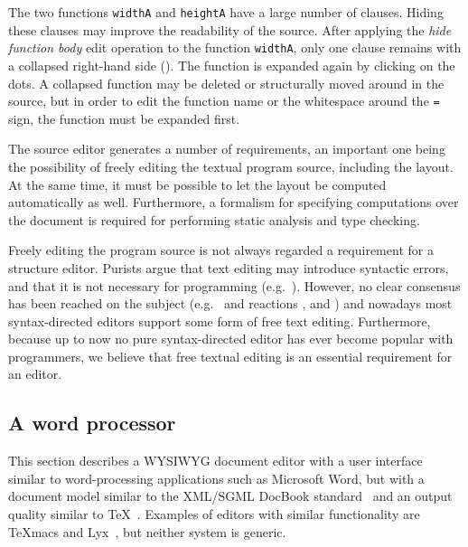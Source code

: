 The two functions \verb|widthA| and \verb|heightA| have a large number of clauses. Hiding these clauses may improve the readability of the source. After applying the {\em hide function body} edit operation to the function \verb|widthA|,  only one clause remains with a collapsed right-hand side ({\tt \framebox{\rule{0cm}{1.5ex}\dots}}). The function is expanded again by clicking on the dots. A collapsed function may be deleted or structurally moved around in the source, but in order to edit the function name or the whitespace around the \verb|=| sign, the function must be expanded first.


The source editor generates a number of requirements, an important one being the possibility of freely editing the textual program source, including the layout. At the same time, it must be possible to let the layout be computed automatically as well. Furthermore, a formalism for specifying computations over the document is required for performing static analysis and type checking.

Freely editing the program source is not always regarded a requirement for a structure editor. Purists argue that text editing may introduce syntactic errors, and that it is not necessary for programming (e.g.~\cite{teitelbaum81progSynth, magnusson90orm}). However, no clear consensus has been reached on the subject (e.g.~\cite{abandonText82waters} and reactions \cite{shani83notAbandon, responseToWaters83notkin}, and \cite{vanter94practical}) and nowadays most syntax-directed editors support some form of free text editing. Furthermore, because up to now no pure syntax-directed editor has ever become popular with programmers, we believe that free textual editing is an essential requirement for an editor.


%																
\subsection{A word processor} \label{sect:wordprocessor} This section describes a WYSIWYG document editor with a user interface similar to word-processing applications such as Microsoft Word, but with a document model similar to the XML/SGML DocBook standard~\cite{walsh02docbook} and an output quality similar to \TeX~\cite{knuth84tex}. Examples of editors with similar functionality are TeXmacs\cite{texmacs} and Lyx~\cite{lyx}, but neither system is generic.


